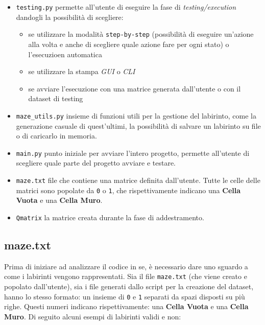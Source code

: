 \begin{itemize}
	\item \lstinline[style=cmd]|testing.py| permette all'utente di eseguire la fase di \textit{testing/execution} dandogli la possibilit\`{a} di scegliere:
	\begin{itemize}
		\item se utilizzare la modalit\`{a} \lstinline[style=cmd]|step-by-step| (possibilit\`{a} di eseguire un'azione alla volta e anche di scegliere quale azione fare per ogni stato) o l'esecuzioen automatica
		\item se utilizzare la stampa \textit{GUI} o \textit{CLI}
		\item se avviare l'esecuzione con una matrice generata dall'utente o con il dataset di testing
	\end{itemize}
	\item \lstinline[style=cmd]|maze_utils.py| insieme di funzioni utili per la gestione del labirinto, come la generazione casuale di quest'ultimi, la possibilit\`{a} di salvare un labirinto su file o di caricarlo in memoria.
	\item \lstinline[style=cmd]|main.py| punto iniziale per avviare l'intero progetto, permette all'utente di scegliere quale parte del progetto avviare e testare.
	\item \lstinline[style=cmd]|maze.txt| file che contiene una matrice definita dall'utente. Tutte le celle delle matrici sono popolate da \lstinline[style=cmd]|0| o \lstinline[style=cmd]|1|, che rispettivamente indicano una \textbf{Cella Vuota} e una \textbf{Cella Muro}.
	\item \lstinline[style=cmd]|Qmatrix| la matrice creata durante la fase di addestramento.
\end{itemize}

\subsection{maze.txt}

Prima di iniziare ad analizzare il codice in se, \`{e} necessario dare uno sguardo a come i labirinti vengono rappresentati. Sia il file \lstinline[style=cmd]|maze.txt| (che viene creato e popolato dall'utente), sia i file generati dallo script per la creazione del dataset, hanno lo stesso formato: un insieme di \lstinline[style=cmd]|0| e \lstinline[style=cmd]|1| separati da spazi disposti su pi\`{u} righe. Questi numeri indicano rispettivamente: una \textbf{Cella Vuota} e una \textbf{Cella Muro}.
Di seguito alcuni esempi di labirinti validi e non:\\

